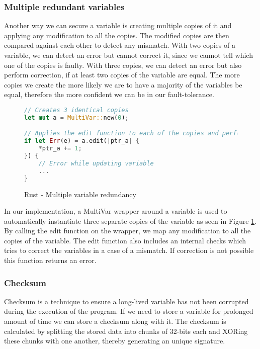 \subsubsection{Multiple redundant variables}

Another way we can secure a variable is creating multiple copies of it and applying any modification to all the copies. The modified copies are then compared against each other to detect any mismatch. With two copies of a variable, we can detect an error but cannot correct it, since we cannot tell which one of the copies is faulty. With three copies, we can detect an error but also perform correction, if at least two copies of the variable are equal. The more copies we create the more likely we are to have a majority of the variables be equal, therefore the more confident we can be in our fault-tolerance.

\begin{figure}[!h]
\begin{lstlisting}[language=Rust]
// Creates 3 identical copies
let mut a = MultiVar::new(0);

// Applies the edit function to each of the copies and performs equality check
if let Err(e) = a.edit(|ptr_a| {
    *ptr_a += 1;
}) {
    // Error while updating variable
    ...
}
\end{lstlisting}
\caption{Rust - Multiple variable redundancy}
\label{fig:multivar}
\end{figure}

In our implementation, a MultiVar wrapper around a variable is used to automatically instantiate three separate copies of the variable as seen in Figure \ref{fig:multivar}. By calling the edit function on the wrapper, we map any modification to all the copies of the variable. The edit function also includes an internal checks which tries to correct the variables in a case of a mismatch. If correction is not possible this function returns an error.

\subsubsection{Checksum} \label{sec:checksum}

Checksum is a technique to ensure a long-lived variable has not been corrupted during the execution of the program. If we need to store a variable for prolonged amount of time we can store a checksum along with it. The checksum is calculated by splitting the stored data into chunks of 32-bits each and XORing these chunks with one another, thereby generating an unique signature.

